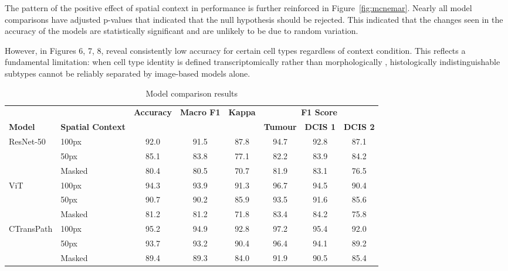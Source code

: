 \documentclass[11pt,a4paper]{article}
\begin{document}
The pattern of the positive effect of spatial context in performance is further reinforced in Figure~\ref{fig:mcnemar}. Nearly all model comparisons have adjusted p-values that indicated that the null hypothesis should be rejected. This indicated that the changes seen in the accuracy of the models are statistically significant and are unlikely to be due to random variation.

However, in Figures 6, 7, 8, reveal consistently low accuracy for certain cell types regardless of context condition. This reflects a fundamental limitation: when cell type identity is defined transcriptomically rather than morphologically \citep{janesick2023}, histologically indistinguishable subtypes cannot be reliably separated by image-based models alone.




\begin{table}[ht]
\centering
\begin{adjustbox}{center}
\begin{tabular}{llcccccc}
\toprule
 &  & \textbf{Accuracy} & \textbf{Macro F1} & \textbf{Kappa} & \multicolumn{3}{c}{\textbf{F1 Score}} \\
\cmidrule(lr){6-8}
\textbf{Model} & \textbf{Spatial Context} &  &  &  & \textbf{Tumour} & \textbf{DCIS 1} & \textbf{DCIS 2} \\
\midrule
\multirow[t]{3}{*}{ResNet-50} & 100px & 92.0 & 91.5 & 87.8 & 94.7 & 92.8 & 87.1 \\
 & 50px & 85.1 & 83.8 & 77.1 & 82.2 & 83.9 & 84.2 \\
 & Masked & 80.4 & 80.5 & 70.7 & 81.9 & 83.1 & 76.5 \\
\cline{1-8}
\multirow[t]{3}{*}{ViT} & 100px & 94.3 & 93.9 & 91.3 & 96.7 & 94.5 & 90.4 \\
 & 50px & 90.7 & 90.2 & 85.9 & 93.5 & 91.6 & 85.6 \\
 & Masked & 81.2 & 81.2 & 71.8 & 83.4 & 84.2 & 75.8 \\
\cline{1-8}
\multirow[t]{3}{*}{CTransPath} & 100px & 95.2 & 94.9 & 92.8 & 97.2 & 95.4 & 92.0 \\
 & 50px & 93.7 & 93.2 & 90.4 & 96.4 & 94.1 & 89.2 \\
 & Masked & 89.4 & 89.3 & 84.0 & 91.9 & 90.5 & 85.4 \\
\cline{1-8}
\bottomrule
\end{tabular}
\end{adjustbox}
\caption{Model comparison results}
\label{tab:models}
\end{table}
\end{document}
